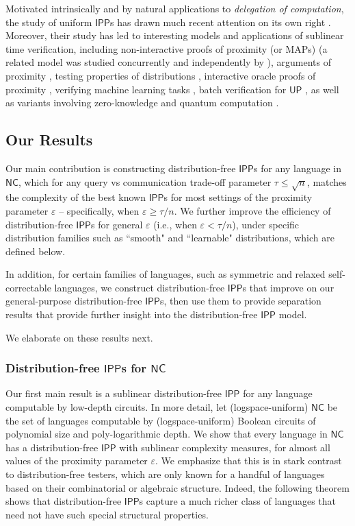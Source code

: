 \documentclass[10pt,a4paper]{article}
\newcommand{\NC}{\mathsf{NC}}
\newcommand{\IPP}{\mathsf{IPP}}
\begin{document}
Motivated intrinsically and by natural applications to \textit{delegation of computation}, the study of uniform $\IPP$s has drawn much recent attention on its own right \cite{RVW,GR18,KR15,RRR21,GG21_universal,GR22_sample}. Moreover, their study has led to interesting models and applications of sublinear time verification, including non-interactive proofs of proximity (or \textsf{MAP}s) \cite{GR18} (a related model was studied concurrently and independently by \cite{FGL14}), arguments of proximity \cite{KR15}, testing properties of distributions \cite{CG18,HR22}, interactive oracle proofs of proximity \cite{RRR21,BBHR18,RR20,BLNR22}, verifying machine learning tasks \cite{GRSY21}, batch verification for $\mathsf{UP}$ \cite{RRR18,RR20_batch_polylog}, as well as variants involving zero-knowledge \cite{BRV18} and quantum computation \cite{DGMT22}. 

\subsection{Our Results}
\label{sec:results}
Our main contribution is constructing distribution-free $\IPP$s for any language in $\NC$, which for any query vs communication trade-off parameter $\tau \leq \sqrt{n}$, matches the complexity of the best known $\IPP$s for most settings of the proximity parameter $\varepsilon$ -- specifically, when $\varepsilon \geq \tau/n$. We further improve the efficiency of distribution-free $\IPP$s for general $\varepsilon$ (i.e., when $\varepsilon<\tau/n$), under specific distribution families such as ``smooth" and ``learnable" distributions, which are defined below.

In addition, for certain families of languages, such as symmetric and relaxed self-correctable languages, we construct distribution-free $\IPP$s that improve on our general-purpose distribution-free $\IPP$s, then use them to provide separation results that provide further insight into the distribution-free $\IPP$ model.

We elaborate on these results next.

\subsubsection{Distribution-free $\IPP$s for $\NC$}
Our first main result is a sublinear distribution-free $\IPP$ for any language computable by low-depth circuits. In more detail, let (logspace-uniform) $\NC$ be the set of languages computable by (logspace-uniform) Boolean circuits of polynomial size and poly-logarithmic depth. We show that every language in $\NC$ has a distribution-free $\IPP$ with sublinear complexity measures, for almost all values of the proximity parameter $\varepsilon$. We emphasize that this is in stark contrast to distribution-free testers, which are only known for a handful of languages based on their combinatorial or algebraic structure. Indeed, the following theorem shows that distribution-free $\IPP$s capture a much richer class of languages that need not have such special structural properties.
\end{document}
